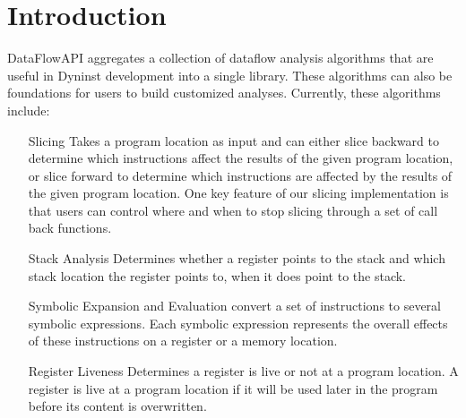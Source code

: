 \section{Introduction}
\label{sec:intro}

DataFlowAPI aggregates a collection of dataflow analysis algorithms that are
useful in Dyninst development into a single library. These algorithms can also
be foundations for users to build customized analyses. Currently, these algorithms include:

\begin{itemize}
\item [Slicing] Takes a program location as input and can either slice
backward to determine which instructions affect the results of the given program location, or
slice forward to determine which instructions are affected by the results of the
given program location. One key feature of our slicing implementation is that
users can control where and when to stop slicing through a set of call back
functions.

\item [Stack Analysis] Determines whether a register points to the stack and
which stack location the register points to, when it does point to the stack.

\item [Symbolic Expansion and Evaluation] convert a set of instructions to
several symbolic expressions. Each symbolic expression represents the overall effects of
these instructions on a register or a memory location.

\item [Register Liveness] Determines a register is live or not at a program
location. A register is live at a program location if it will be used later in the program before its
content is overwritten. 
\end{itemize}

